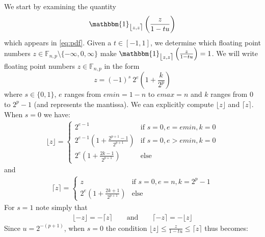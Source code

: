 \documentclass[10pt,a4paper]{article}
\theoremstyle{plain}
\theoremstyle{definition}
\newcommand{\F}[1][n,p]{\mathbb{F}_{#1}}
\newcommand{\one}{\mathbbm{1}}
\newcommand{\ceil}[1]{\lceil #1 \rceil}
\newcommand{\floor}[1]{\lfloor #1 \rfloor}
\newcommand{\fintvl}[1][x]{\mathlarger{\lfloor}#1,#1\mathlarger{\rceil}}
\begin{document}
We start by examining the quantity
\[
\one_{\fintvl[z]}\left(\frac{z}{1-tu}\right)
\]
which appears in \eqref{eq:pdf}. Given a $t\in\left[-1,1\right]$, we determine which floating point numbers $z\in\F\setminus\{-\infty,0,\infty\}$ make $\one_{\fintvl[z]}\left(\frac{z}{1-tu}\right)=1$. We will write floating point numbers $z\in\F$ in the form
\[
z=(-1)^s ~ 2^e \left(1+\frac{k}{2^p}\right)
\]
where $s\in\{0,1\}$, $e$ ranges from $emin=1-n$ to $emax=n$ and $k$ ranges from 0 to $2^p-1$ (and represents the mantissa). We can explicitly compute $\floor{z}$ and $\ceil{z}$. When $s=0$ we have:
\begin{align}
\floor{z}=
\begin{cases}
2^{e-1} & \text{if }s=0, e=emin, k=0\\
2^{e-1}\left(1+\frac{2^{p+1}-1}{2^{p+1}}\right) & \text{if }s=0, e>emin, k=0\\
2^e\left(1+\frac{2k-1}{2^{p+1}}\right) & \text{else}
\end{cases}
\end{align}
and
\begin{align}
\ceil{z}=\begin{cases}
z&\text{if }s=0, e=n, k=2^p-1\\
2^e\left(1+\frac{2k+1}{2^{p+1}}\right) & \text{else}
\end{cases}
\end{align}
For $s=1$ note simply that
\begin{align}
\floor{-z}=-\ceil{z}\qquad\text{and}\qquad\ceil{-z}=-\floor{z}\label{eq:minz}
\end{align}
Since $u=2^{-(p+1)}$, when $s=0$ the condition $\floor{z}\leq \frac{z}{1-tu}\leq \ceil{z}$ thus becomes:
\end{document}
